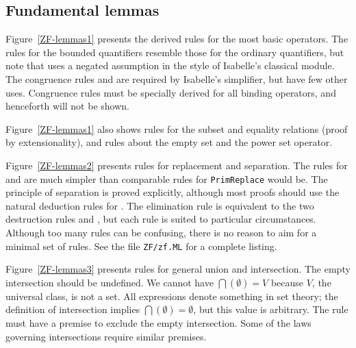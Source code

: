 \subsection{Fundamental lemmas}
Figure~\ref{ZF-lemmas1} presents the derived rules for the most basic
operators.  The rules for the bounded quantifiers resemble those for the
ordinary quantifiers, but note that  uses a negated
assumption in the style of Isabelle's classical module.  The congruence rules
 and  are required by Isabelle's
simplifier, but have few other uses.  Congruence rules must be specially
derived for all binding operators, and henceforth will not be shown.

Figure~\ref{ZF-lemmas1} also shows rules for the subset and equality
relations (proof by extensionality), and rules about the empty set and the
power set operator.

Figure~\ref{ZF-lemmas2} presents rules for replacement and separation.
The rules for  and  are much simpler than
comparable rules for {\tt PrimReplace} would be.  The principle of
separation is proved explicitly, although most proofs should use the
natural deduction rules for .  The elimination rule
 is equivalent to the two destruction rules
 and , but each rule is suited to
particular circumstances.  Although too many rules can be confusing, there
is no reason to aim for a minimal set of rules.  See the file
{\tt ZF/zf.ML} for a complete listing.

Figure~\ref{ZF-lemmas3} presents rules for general union and intersection.
The empty intersection should be undefined.  We cannot have
$\bigcap(\emptyset)=V$ because $V$, the universal class, is not a set.  All
expressions denote something in {\ZF} set theory; the definition of
intersection implies $\bigcap(\emptyset)=\emptyset$, but this value is
arbitrary.  The rule  must have a premise to exclude
the empty intersection.  Some of the laws governing intersections require
similar premises.



